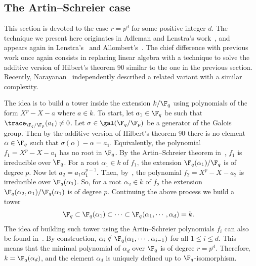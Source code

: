 \subsection{The Artin--Schreier case}
\label{sec:fast-artin-schreier}

This section is devoted to the case $r = p^d$ for some positive integer $d$.
The technique we present here originates in Adleman and Lenstra's work~\cite[Lemma 5]{Adleman-Lenstra},
and appears again in Lenstra's~\cite{LenstraJr91}
and Allombert's~\cite{Allombert02}.
The chief difference with previous work once again consists
in replacing linear algebra
with a technique to solve the additive version of Hilbert's theorem 90
similar to the one in the previous section.
Recently, Narayanan~\cite[Sec.~4]{narayanan2016fast} independently described
a related variant with a similar complexity.

The idea is to build a 
tower inside the extension $k/\F_q$ using polynomials of the form $X^p - X - a$ where $a \in k$.
To  start, let $a_1 \in \F_q$ be such that $\trace_{\F_q/\F_p}(a_1) \ne 0$.
Let $\sigma \in  \gal(\F_q/\F_p)$ be a generator of the Galois group.
Then by the additive version of  Hilbert's theorem 90 there is no element 
$\alpha \in \F_q$ such that $\sigma(\alpha) - \alpha = a_1$.
Equivalently, the polynomial $f_1 =  X^p - X - a_1$ has no root in $\F_q$.
By the Artin--Schreier theorem in~\cite[Ch VI]{lang}, $f_1$ 
is irreducible over $\F_q$. For a root $\alpha_1 \in k$ of $f_1$, the extension $\F_q(\alpha_1) / \F_q$ is of degree $p$.
Now let $a_2 = a_1\alpha_1^{p - 1}$. Then, by~\cite[Lemma 5]{Adleman-Lenstra}, the polynomial $f_2 = 
X^p - X - a_2$ is irreducible over $\F_q(\alpha_1)$. So, for a root $\alpha_2 \in k$ of $f_2$ the 
extension $\F_q(\alpha_2, \alpha_1) / \F_q(\alpha_1)$ is of degree $p$. Continuing the above 
process we build a tower
\begin{equation}
	\label{equ:art-sch-tower}
	\F_q \subset \F_q(\alpha_1)  \subset \cdots \subset \F_q(\alpha_1, \cdots, \alpha_d) = k.
\end{equation}
The idea of building such tower using the Artin--Schreier polynomials $f_i$ can also be found
in~\cite{LenstraJr91, Allombert02, shoup93}. By construction, $\alpha_i \notin \F_q(\alpha_1, \cdots, 
\alpha_{i - 1})$ for all $1 \le i \le d$. This means that the minimal polynomial of $\alpha_d$ over 
$\F_q$ is of degree $r = p^d$. Therefore, $k = \F_q(\alpha_d)$, and the element $\alpha_d$ is 
uniquely defined up to $\F_q$-isomorphism.

